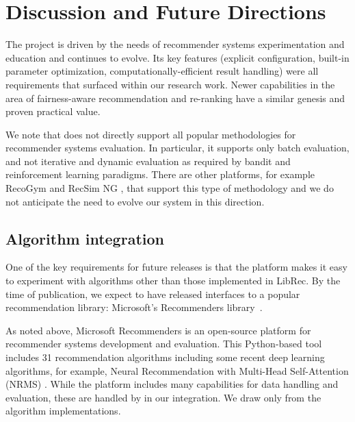 \section{Discussion and Future Directions}
The \libauto{} project is driven by the needs of recommender systems experimentation and education and continues to evolve. Its key features (explicit configuration, built-in parameter optimization, computationally-efficient result handling) were all requirements that surfaced within our research work. Newer capabilities in the area of fairness-aware recommendation and re-ranking have a similar genesis and proven practical value. 

We note that \libauto{} does not directly support all popular methodologies for recommender systems evaluation. In particular, it supports only batch evaluation, and not iterative and dynamic evaluation as required by bandit and reinforcement learning paradigms. There are other platforms, for example RecoGym \cite{rohde2018recogym} and RecSim NG \cite{mladenov2021recsim}, that support this type of methodology and we do not anticipate the need to evolve our system in this direction. 

\subsection{Algorithm integration}
One of the key requirements for future releases is that the platform makes it easy to experiment with algorithms other than those implemented in LibRec. By the time of publication, we expect to have released interfaces to a popular recommendation library: Microsoft's Recommenders library~\cite{argyriou2020microsoft}. 


As noted above, Microsoft Recommenders \cite{MicrosoftRecommenders} is an open-source platform for recommender systems development and evaluation. This Python-based tool includes 31 recommendation algorithms including some recent deep learning algorithms, for example, Neural Recommendation with Multi-Head Self-Attention (NRMS) \cite{wu2019neural}. While the platform includes many capabilities for data handling and evaluation, these are handled by \libauto{} in our integration. We draw only from the algorithm implementations. 

